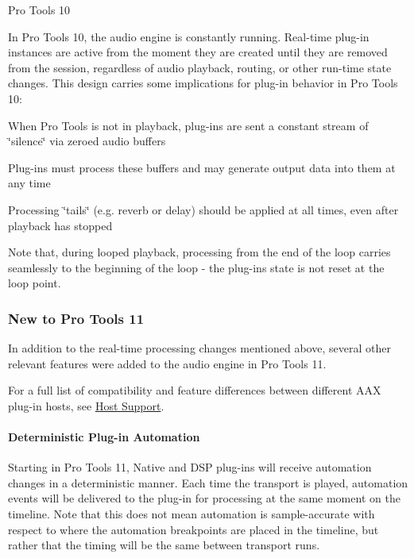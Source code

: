  Pro Tools 10

In Pro Tools 10, the audio engine is constantly running. Real-\/time plug-\/in instances are active from the moment they are created until they are removed from the session, regardless of audio playback, routing, or other run-\/time state changes. This design carries some implications for plug-\/in behavior in Pro Tools 10\+:


\begin{DoxyItemize}
\item When Pro Tools is not in playback, plug-\/ins are sent a constant stream of \char`\"{}silence\char`\"{} via zeroed audio buffers  
\item Plug-\/ins must process these buffers and may generate output data into them at any time  
\item Processing \char`\"{}tails\char`\"{} (e.\+g. reverb or delay) should be applied at all times, even after playback has stopped  
\end{DoxyItemize}

Note that, during looped playback, processing from the end of the loop carries seamlessly to the beginning of the loop -\/ the plug-\/in\textquotesingle{}s state is not reset at the loop point.

\hypertarget{a00360_subsection__new_to_pro_tools_11}{}\subsubsection{New to Pro Tools 11}\label{a00360_subsection__new_to_pro_tools_11}
 In addition to the real-\/time processing changes mentioned above, several other relevant features were added to the audio engine in Pro Tools 11.

For a full list of compatibility and feature differences between different A\+A\+X plug-\/in hosts, see \hyperlink{a00373}{Host Support}.

\hypertarget{a00360_subsubsection__deterministic_plug-in_automation}{}\paragraph{Deterministic Plug-\/in Automation}\label{a00360_subsubsection__deterministic_plug-in_automation}
 Starting in Pro Tools 11, Native and D\+S\+P plug-\/ins will receive automation changes in a deterministic manner. Each time the transport is played, automation events will be delivered to the plug-\/in for processing at the same moment on the timeline. Note that this does not mean automation is sample-\/accurate with respect to where the automation breakpoints are placed in the timeline, but rather that the timing will be the same between transport runs.

